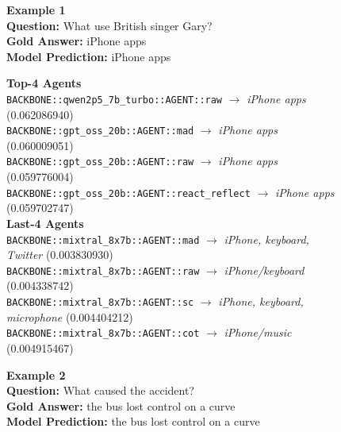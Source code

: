 \documentclass[11pt]{article}
\begin{document}
\begin{figure}[t]
\centering
\begin{tcolorbox}[colback=myblue!5!white,
                  colframe=myblue!75!black,
                  title=Agent Routing Examples (Three QA Cases)]
{

\textbf{Example 1}\\
\textbf{Question:} What use British singer Gary?\\
\textbf{Gold Answer:} iPhone apps\\
\textbf{Model Prediction:} iPhone apps

\vspace{4pt}
\textbf{Top-4 Agents}\\
\texttt{BACKBONE::qwen2p5\_7b\_turbo::AGENT::raw} $\rightarrow$ \emph{iPhone apps} (0.062086940)\\
\texttt{BACKBONE::gpt\_oss\_20b::AGENT::mad} $\rightarrow$ \emph{iPhone apps} (0.060009051)\\
\texttt{BACKBONE::gpt\_oss\_20b::AGENT::raw} $\rightarrow$ \emph{iPhone apps} (0.059776004)\\
\texttt{BACKBONE::gpt\_oss\_20b::AGENT::react\_reflect} $\rightarrow$ \emph{iPhone apps} (0.059702747)\\[4pt]
\textbf{Last-4 Agents}\\
\texttt{BACKBONE::mixtral\_8x7b::AGENT::mad} $\rightarrow$ \emph{iPhone, keyboard, Twitter} (0.003830930)\\
\texttt{BACKBONE::mixtral\_8x7b::AGENT::raw} $\rightarrow$ \emph{iPhone/keyboard} (0.004338742)\\
\texttt{BACKBONE::mixtral\_8x7b::AGENT::sc} $\rightarrow$ \emph{iPhone, keyboard, microphone} (0.004404212)\\
\texttt{BACKBONE::mixtral\_8x7b::AGENT::cot} $\rightarrow$ \emph{iPhone/music} (0.004915467)

\vspace{10pt}
\textbf{Example 2}\\
\textbf{Question:} What caused the accident?\\
\textbf{Gold Answer:} the bus lost control on a curve\\
\textbf{Model Prediction:} the bus lost control on a curve

}
\end{tcolorbox}
\end{figure}
\end{document}
